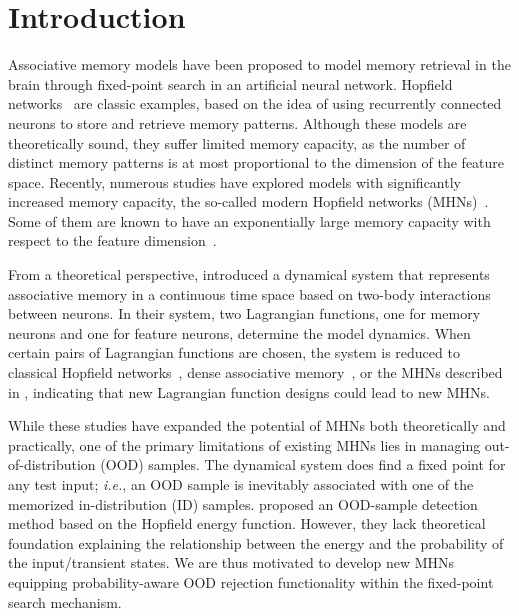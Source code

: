 \section{Introduction}


Associative memory models have been proposed to model memory retrieval in the brain through fixed-point search in an artificial neural network. Hopfield networks~\citep{hopfield82,hopfield88} are classic examples, based on the idea of using recurrently connected neurons to store and retrieve memory patterns. Although these models are theoretically sound, they suffer limited memory capacity, as the number of distinct memory patterns is at most proportional to the dimension of the feature space.
Recently, numerous studies have explored models with significantly increased memory capacity, the so-called modern Hopfield networks (MHNs)~\citep{krotov16dense,demircigil17hugecapacity,krotov2018dense,BARRA2018205,agliari2020tolerance}.
Some of them are known to have an exponentially large memory capacity with respect to the feature dimension~\cite{demircigil17hugecapacity}.

From a theoretical perspective,
\citet{krotov2021large} introduced a dynamical system that represents associative memory in a continuous time space based on two-body interactions between neurons.
In their system, two Lagrangian functions, one for memory neurons and one for feature neurons, determine the model dynamics.
When certain pairs of Lagrangian functions are chosen,
the system is reduced to classical Hopfield networks~\cite{hopfield82},
dense associative memory~\cite{krotov16dense, demircigil17hugecapacity},
or the MHNs described in \citet{ramsauer21hopfieldallyouneed}, indicating that new Lagrangian function designs could lead to new MHNs.


While these studies have expanded the potential of MHNs both theoretically and practically, one of the primary limitations of existing MHNs lies in managing out-of-distribution (OOD) samples.
The dynamical system does find a fixed point for any test input; \textit{i.e.}, an OOD sample is inevitably associated with one of the memorized in-distribution (ID) samples.
\citet{zhang23she} proposed an OOD-sample detection method based on the Hopfield energy function.
However, they lack theoretical foundation explaining the relationship between the energy and the probability of the input/transient states.
We are thus motivated to develop new MHNs equipping probability-aware OOD rejection functionality within the fixed-point search mechanism.

